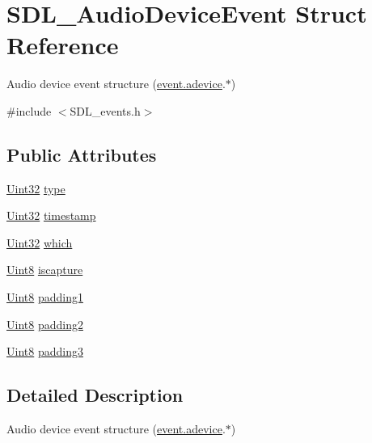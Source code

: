 \hypertarget{struct_s_d_l___audio_device_event}{\section{S\-D\-L\-\_\-\-Audio\-Device\-Event Struct Reference}
\label{struct_s_d_l___audio_device_event}
}


Audio device event structure (\hyperlink{union_s_d_l___event_a111e01fcac4fd8e251a6058ff9f17e72}{event.\-adevice}.$\ast$)  




{\ttfamily \#include $<$S\-D\-L\-\_\-events.\-h$>$}

\subsection*{Public Attributes}
\begin{DoxyCompactItemize}
\item 
\hyperlink{_s_d_l__stdinc_8h_add440eff171ea5f55cb00c4a9ab8672d}{Uint32} \hyperlink{struct_s_d_l___audio_device_event_ae68c3bd49b49608711a17395c7cbfe58}{type}
\item 
\hyperlink{_s_d_l__stdinc_8h_add440eff171ea5f55cb00c4a9ab8672d}{Uint32} \hyperlink{struct_s_d_l___audio_device_event_aa471680486a6103eafc9af569016df57}{timestamp}
\item 
\hyperlink{_s_d_l__stdinc_8h_add440eff171ea5f55cb00c4a9ab8672d}{Uint32} \hyperlink{struct_s_d_l___audio_device_event_ac91d70fd4e1dd596185fed061388896c}{which}
\item 
\hyperlink{_s_d_l__stdinc_8h_a2944638813a090aa23e62f4da842c3e2}{Uint8} \hyperlink{struct_s_d_l___audio_device_event_a1482dcd50b47046ef8e9bfa7cc7457d9}{iscapture}
\item 
\hyperlink{_s_d_l__stdinc_8h_a2944638813a090aa23e62f4da842c3e2}{Uint8} \hyperlink{struct_s_d_l___audio_device_event_ad6efdec7189e735f4a05fc123c0cb723}{padding1}
\item 
\hyperlink{_s_d_l__stdinc_8h_a2944638813a090aa23e62f4da842c3e2}{Uint8} \hyperlink{struct_s_d_l___audio_device_event_adf9bebd56d707860045d31359535a2a4}{padding2}
\item 
\hyperlink{_s_d_l__stdinc_8h_a2944638813a090aa23e62f4da842c3e2}{Uint8} \hyperlink{struct_s_d_l___audio_device_event_af3163ba92c77f08a4f0d8f043f24c96c}{padding3}
\end{DoxyCompactItemize}


\subsection{Detailed Description}
Audio device event structure (\hyperlink{union_s_d_l___event_a111e01fcac4fd8e251a6058ff9f17e72}{event.\-adevice}.$\ast$) 

